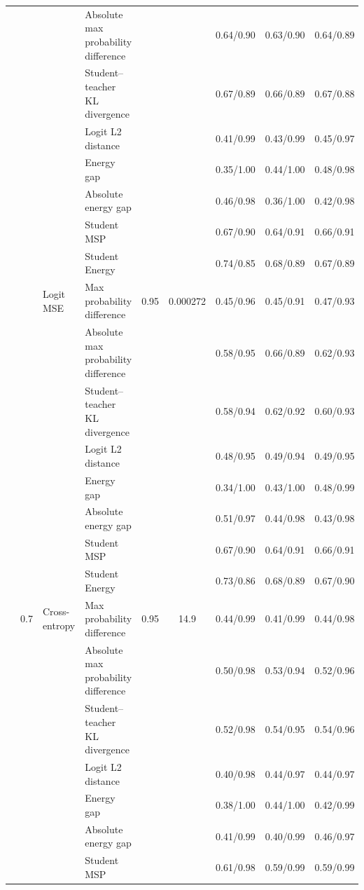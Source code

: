 \documentclass[border=2pt]{standalone}
\begin{document}
\begin{tabular}{llllccccc}
 &  &  & Absolute max probability difference &  &  & 0.64/0.90 & 0.63/0.90 & 0.64/0.89 \\
 &  &  & Student--teacher KL divergence &  &  & 0.67/0.89 & 0.66/0.89 & 0.67/0.88 \\
 &  &  & Logit L2 distance &  &  & 0.41/0.99 & 0.43/0.99 & 0.45/0.97 \\
 &  &  & Energy gap &  &  & 0.35/1.00 & 0.44/1.00 & 0.48/0.98 \\
 &  &  & Absolute energy gap &  &  & 0.46/0.98 & 0.36/1.00 & 0.42/0.98 \\
 &  &  & Student MSP &  &  & 0.67/0.90 & 0.64/0.91 & 0.66/0.91 \\
 &  &  & Student Energy &  &  & 0.74/0.85 & 0.68/0.89 & 0.67/0.89 \\
\addlinespace
 &  & Logit MSE & Max probability difference & 0.95 & 0.000272 & 0.45/0.96 & 0.45/0.91 & 0.47/0.93 \\
 &  &  & Absolute max probability difference &  &  & 0.58/0.95 & 0.66/0.89 & 0.62/0.93 \\
 &  &  & Student--teacher KL divergence &  &  & 0.58/0.94 & 0.62/0.92 & 0.60/0.93 \\
 &  &  & Logit L2 distance &  &  & 0.48/0.95 & 0.49/0.94 & 0.49/0.95 \\
 &  &  & Energy gap &  &  & 0.34/1.00 & 0.43/1.00 & 0.48/0.99 \\
 &  &  & Absolute energy gap &  &  & 0.51/0.97 & 0.44/0.98 & 0.43/0.98 \\
 &  &  & Student MSP &  &  & 0.67/0.90 & 0.64/0.91 & 0.66/0.91 \\
 &  &  & Student Energy &  &  & 0.73/0.86 & 0.68/0.89 & 0.67/0.90 \\
\addlinespace
 & 0.7 & Cross-entropy & Max probability difference & 0.95 & 14.9 & 0.44/0.99 & 0.41/0.99 & 0.44/0.98 \\
 &  &  & Absolute max probability difference &  &  & 0.50/0.98 & 0.53/0.94 & 0.52/0.96 \\
 &  &  & Student--teacher KL divergence &  &  & 0.52/0.98 & 0.54/0.95 & 0.54/0.96 \\
 &  &  & Logit L2 distance &  &  & 0.40/0.98 & 0.44/0.97 & 0.44/0.97 \\
 &  &  & Energy gap &  &  & 0.38/1.00 & 0.44/1.00 & 0.42/0.99 \\
 &  &  & Absolute energy gap &  &  & 0.41/0.99 & 0.40/0.99 & 0.46/0.97 \\
 &  &  & Student MSP &  &  & 0.61/0.98 & 0.59/0.99 & 0.59/0.99 \\

\end{tabular}
\end{document}
